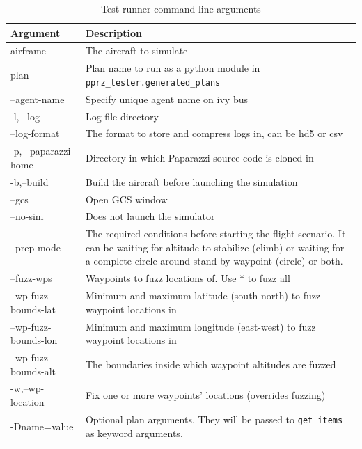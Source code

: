 \begin{table}
    \centering
\begin{longtable}{lp{}}
\toprule
\textbf{Argument}   & \textbf{Description}\\ \midrule
\endhead
%
\bottomrule
\endfoot
%
\endlastfoot
airframe              &  The aircraft to simulate \\
plan                  &  Plan name to run as a python module in \verb|pprz_tester.generated_plans| \\
--agent-name          &  Specify unique agent name on ivy bus \\
-l, --log             &  Log file directory \\
--log-format          &  The format to store and compress logs in, can be hd5 or csv \\ \midrule
-p, --paparazzi-home  &  Directory in which Paparazzi source code is cloned in \\
-b,--build            &  Build the aircraft before launching the simulation \\
--gcs                 &  Open GCS window \\
--no-sim              &  Does not launch the simulator \\
--prep-mode           &  The required conditions before starting the flight scenario. It can be waiting for altitude to stabilize (climb) or waiting for a complete circle around stand by waypoint (circle) or both. \\ \midrule
--fuzz-wps            &  Waypoints to fuzz locations of. Use * to fuzz all \\
--wp-fuzz-bounds-lat  &  Minimum and maximum latitude (south-north) to fuzz waypoint locations in \\
--wp-fuzz-bounds-lon  &  Minimum and maximum longitude (east-west) to fuzz waypoint locations in \\
--wp-fuzz-bounds-alt  &  The boundaries inside which waypoint altitudes are fuzzed \\
-w,--wp-location      &  Fix one or more waypoints' locations (overrides fuzzing) \\ \midrule
-Dname=value          &  Optional plan arguments. They will be passed to \verb|get_items| as keyword arguments. \\ \bottomrule
\end{longtable}
\caption{Test runner command line arguments}
\label{tab:test_runner_commandline_args}
\end{table}


